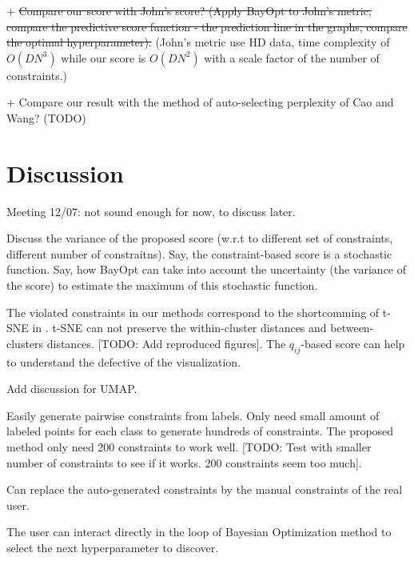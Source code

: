 + \st{Compare our score with John's score? (Apply BayOpt to John's metric, compare the predictive score function - the prediction line in the graphs, compare the optimal hyperparameter).}
(John's metric use HD data, time complexity of $O(DN^3)$ while our score is $O(DN^2)$ with a scale factor of the number of constraints.)

+ Compare our result with the method of auto-selecting perplexity of Cao and Wang? (TODO)





\section{Discussion}
Meeting 12/07: not sound enough for now, to discuss later.

\par
Discuss the variance of the proposed score (w.r.t to different set of constraints, different number of constraitns).
Say, the constraint-based score is a stochastic function.
Say, how BayOpt can take into account the uncertainty (the variance of the score) to estimate the maximum of this stochastic function.


\par
The violated constraints in our methods correspond to the shortcomming of t-SNE in \cite{wattenberg2016use}.
t-SNE can not preserve the within-cluster distances and between-clusters distances.
[TODO: Add reproduced figures].
The $q_{ij}$-based score can help to understand the defective of the visualization.

\par
Add discussion for UMAP.

\par
Easily generate pairwise constraints from labels.
  Only need small amount of labeled points for each class to generate hundreds of constraints.
  The proposed method only need 200 constraints to work well.
  [TODO: Test with smaller number of constraints to see if it works. 200 constraints seem too much].

\par
Can replace the auto-generated constraints by the manual constraints of the real user.

\par
The user can interact directly in the loop of Bayesian Optimization method to select the next hyperparameter to discover.


